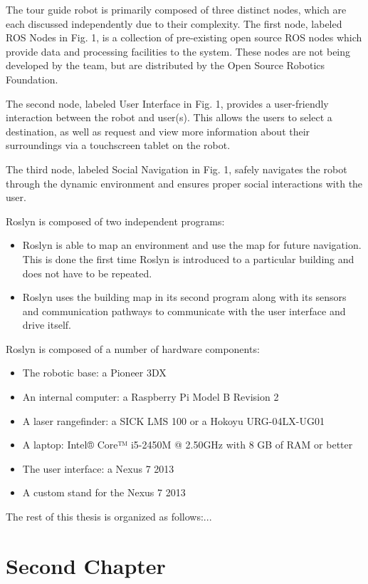 \documentclass[11pt]{report}
\begin{document}
The tour guide robot is primarily composed of three distinct nodes, which are each discussed independently due to their complexity. The first node, labeled ROS Nodes in Fig. 1, is a collection of pre-existing open source ROS nodes which provide data and processing facilities to the system. These nodes are not being developed by the team, but are distributed by the Open Source Robotics Foundation.

The second node, labeled User Interface in Fig. 1, provides a user-friendly interaction between the robot and user(s). This allows the users to select a destination, as well as request and view more information about their surroundings via a touchscreen tablet on the robot.

The third node, labeled Social Navigation in Fig. 1, safely navigates the robot through the dynamic environment and ensures proper social interactions with the user.

Roslyn is composed of two independent programs:
\begin{itemize}
 \item Roslyn is able to map an environment and use the map for future navigation. This is done the first time Roslyn is introduced to a particular building and does not have to be repeated.
 \item Roslyn uses the building map in its second program along with its sensors and communication pathways to communicate with the user interface and drive itself.
\end{itemize}


Roslyn is composed of a number of hardware components:
\begin{itemize}
 \item The robotic base: a Pioneer 3DX
 \item An internal computer: a Raspberry Pi Model B Revision 2
 \item A laser rangefinder: a SICK LMS 100 or a Hokoyu URG-04LX-UG01
 \item A laptop: Intel® Core™ i5-2450M @ 2.50GHz with 8 GB of RAM or better
 \item The user interface: a Nexus 7 2013
 \item A custom stand for the Nexus 7 2013
\end{itemize}

The rest of this thesis is organized as follows:...


\chapter{Second Chapter}
\end{document}
